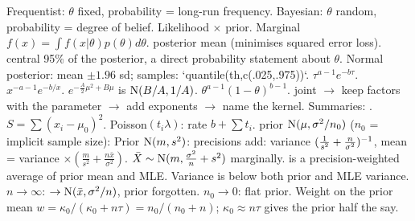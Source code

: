  Frequentist: $\theta$ fixed, probability = long-run frequency. Bayesian: $\theta$ random, probability = degree of belief.
Likelihood $\times$ prior. Marginal $f(x)=\int f(x|\theta)p(\theta)d\theta$.  posterior mean (minimises squared error loss).  central 95\% of the posterior, a direct probability statement about $\theta$. Normal posterior: mean $\pm1.96$ sd; samples: `quantile(th,c(.025,.975))`.
\sk{}  $\tau^{a-1}e^{-b\tau}$.  $x^{-a-1}e^{-b/x}$.  $e^{-\frac A2\mu^2+B\mu}$ is $\mathrm{N}(B/A,1/A)$.  $\theta^{a-1}(1-\theta)^{b-1}$.
\sk{} joint $\to$ keep factors with the parameter $\to$ add exponents $\to$ name the kernel. Summaries: . 
$S=\sum(x_i-\mu_0)^2$.  Poisson$(t_i\lambda)$: rate $b+\sum t_i$.
\sk{} prior $\mathrm{N}(\mu,\sigma^2/n_0)$ ($n_0$ = implicit sample size):
Prior $\mathrm{N}(m,s^2)$: precisions add: variance $(\frac1{s^2}+\frac n{\sigma^2})^{-1}$, mean = variance $\times(\frac m{s^2}+\frac{n\bar x}{\sigma^2})$. $\bar X\sim\mathrm{N}(m,\frac{\sigma^2}n+s^2)$ marginally.
\sk{} is a precision-weighted average of prior mean and MLE. Variance is below both prior and MLE variance. $n\to\infty$: $\to\mathrm{N}(\bar x,\sigma^2/n)$, prior forgotten. $n_0\to0$: flat prior. Weight on the prior mean $w=\kappa_0/(\kappa_0+n\tau)=n_0/(n_0+n)$; $\kappa_0\approx n\tau$ gives the prior half the say.
